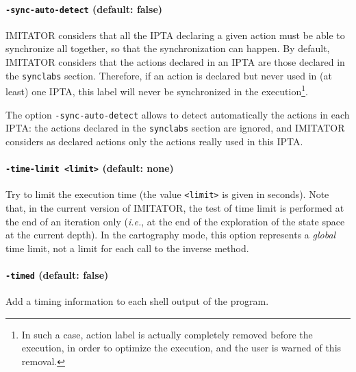 \documentclass[a4paper,11pt]{report}
\newcommand{\imitator}{\textsf{IMITATOR}}
\newcommand{\IPTA}{IPTA}
\newcommand{\styleIMI}[1]{\textcolor{imicolor}{\texttt{#1}}}
\newcommand{\styleOption}[1]{\textcolor{optioncolor}{\texttt{#1}}}
\newcommand{\ie}{\textcolor{colorok}{\textit{i.e.}, }}
\begin{document}
\paragraph{\styleOption{-sync-auto-detect} (default: false)}
\imitator{} considers that all the \IPTA{} declaring a given action must be able to synchronize all together, so that the synchronization can happen.
By default, \imitator{} considers that the actions declared in an \IPTA{} are those declared in the \styleIMI{synclabs} section.
Therefore, if an action is declared but never used in (at least) one \IPTA{}, this label will never be synchronized in the execution\footnote{In such a case, action label is actually completely removed before the execution, in order to optimize the execution, and the user is warned of this removal.}.

The option \styleOption{-sync-auto-detect} allows to detect automatically the actions in each \IPTA{}: the actions declared in the \styleIMI{synclabs} section are ignored, and \imitator{} considers as declared actions only the actions really used in this \IPTA{}.


\paragraph{\styleOption{-time-limit <limit>} (default: none)}
Try to limit the execution time (the value \styleOption{<limit>} is given in seconds).
Note that, in the current version of \imitator{}, the test of time limit is performed at the end of an iteration only (\ie{} at the end of the exploration of the state space at the current depth).
In the cartography mode, this option represents a \emph{global} time limit, not a limit for each call to the inverse method.


\paragraph{\styleOption{-timed} (default: false)}
Add a timing information to each shell output of the program.



\end{document}
